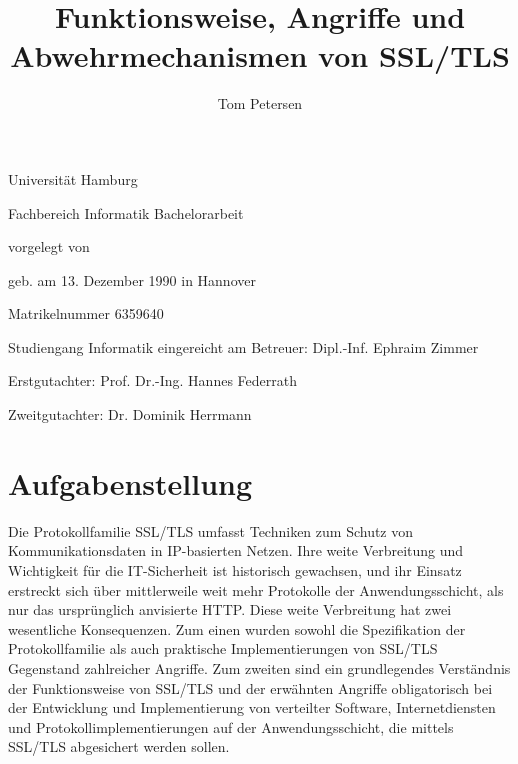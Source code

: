 \documentclass[
    12pt,
    headings=small,
    parskip=half,           %
    bibliography=totoc,
    numbers=noenddot,       %
    open=any,               %
    final                   %
    ]{scrreprt}
\title{Funktionsweise, Angriffe und Abwehrmechanismen von SSL/TLS}
\author{Tom Petersen}
\begin{document}
\thispagestyle{empty}
\begin{titlepage}%
\begin{center}\Large
	Universität Hamburg \par
	Fachbereich Informatik
	\vfill
	Bachelorarbeit
	\vfill
	\makeatletter
	{\Large\textsf{\textbf{\@title}}\par}
	\makeatother
	\vfill
	vorgelegt von
	\par\bigskip
	\makeatletter
	{\@author} \par
	\makeatother
	geb. am 13. Dezember 1990 in Hannover \par
	Matrikelnummer 6359640 \par
	Studiengang Informatik
	\vfill
	\makeatletter
	eingereicht am {\@date}
	\makeatother
	\vfill
	Betreuer: Dipl.-Inf. Ephraim Zimmer\par
	Erstgutachter: Prof. Dr.-Ing. Hannes Federrath \par
	Zweitgutachter: Dr. Dominik Herrmann
\end{center}
\end{titlepage}%

\chapter*{Aufgabenstellung}

Die Protokollfamilie SSL/TLS umfasst Techniken zum Schutz von Kommunikationsdaten in IP-basierten Netzen. Ihre weite Verbreitung und Wichtigkeit für die IT-Sicherheit ist historisch gewachsen, und ihr Einsatz erstreckt sich über mittlerweile weit mehr Protokolle der Anwendungsschicht, als nur das ursprünglich anvisierte HTTP. Diese weite Verbreitung hat zwei wesentliche Konsequenzen. Zum einen wurden sowohl die Spezifikation der Protokollfamilie als auch praktische Implementierungen von SSL/TLS Gegenstand zahlreicher Angriffe. Zum zweiten sind ein grundlegendes Verständnis der Funktionsweise von SSL/TLS und der erwähnten Angriffe obligatorisch bei der Entwicklung und Implementierung von verteilter Software, Internetdiensten und Protokollimplementierungen auf der Anwendungsschicht, die mittels SSL/TLS abgesichert werden sollen. 
\end{document}
